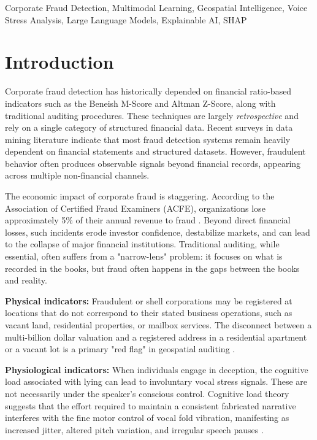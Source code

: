 \documentclass[conference]{IEEEtran}
\begin{document}
\begin{IEEEkeywords}
Corporate Fraud Detection, Multimodal Learning, Geospatial Intelligence,
Voice Stress Analysis, Large Language Models, Explainable AI, SHAP
\end{IEEEkeywords}

\section{Introduction}

Corporate fraud detection has historically depended on financial
ratio-based indicators such as the Beneish M-Score \cite{beneish1999} and Altman Z-Score,
along with traditional auditing procedures. These techniques are largely
\emph{retrospective} and rely on a single category of structured financial
data. Recent surveys in data mining literature \cite{ngai2011} indicate that most fraud
detection systems remain heavily dependent on financial statements and
structured datasets. However, fraudulent behavior often produces
observable signals beyond financial records, appearing across multiple
non-financial channels.

The economic impact of corporate fraud is staggering. According to the Association of Certified Fraud Examiners (ACFE), organizations lose approximately 5\% of their annual revenue to fraud \cite{acfe2024}. Beyond direct financial losses, such incidents erode investor confidence, destabilize markets, and can lead to the collapse of major financial institutions. Traditional auditing, while essential, often suffers from a "narrow-lens" problem: it focuses on what is recorded in the books, but fraud often happens in the gaps between the books and reality.

\textbf{Physical indicators:} Fraudulent or shell corporations may be
registered at locations that do not correspond to their stated business
operations, such as vacant land, residential properties, or mailbox
services. The disconnect between a multi-billion dollar valuation and a registered address in a residential apartment or a vacant lot is a primary "red flag" in geospatial auditing \cite{assenza2023}.

\textbf{Physiological indicators:} When individuals engage in deception,
the cognitive load associated with lying can lead to involuntary vocal
stress signals. These are not necessarily under the speaker's conscious control. Cognitive load theory suggests that the effort required to maintain a consistent fabricated narrative interferes with the fine motor control of vocal fold vibration, manifesting as increased jitter, altered pitch variation, and irregular speech pauses \cite{kirchhubel2013,larson2021}.
\end{document}
